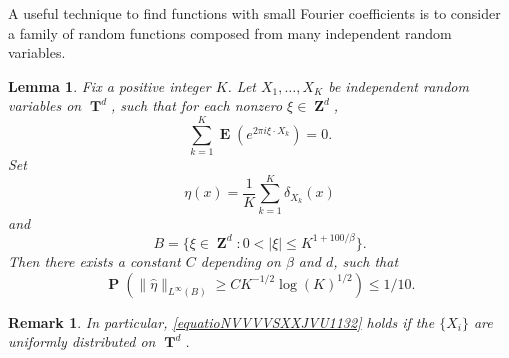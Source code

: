 \documentclass[dvipsnames,letterpaper,12pt]{article}
\numberwithin{equation}{section}
\DeclareMathOperator{\ZZ}{\mathbf{Z}}
\DeclareMathOperator{\TT}{\mathbf{T}}
\newtheorem{lemma}[theorem]{Lemma}
\newtheorem{remark}[theorem]{Remark}
\numberwithin{theorem}{section}
\DeclareMathOperator{\EE}{\mathbf{E}}
\DeclareMathOperator{\PP}{\mathbf{P}}
\begin{document}
A useful technique to find functions with small Fourier coefficients is to consider a family of random functions composed from many independent random variables.

\begin{lemma} \label{LemmaGISCICS1}
    Fix a positive integer $K$. Let $X_1, \dots, X_K$ be independent random variables on $\TT^d$, such that for each nonzero $\xi \in \ZZ^d$,
    \begin{equation} \label{equatioNVVVVSXXJVU1132}
        \sum_{k = 1}^K \EE \left( e^{2 \pi i \xi \cdot X_k} \right) = 0.
    \end{equation}
    Set
    \[ \eta(x) = \frac{1}{K} \sum_{k = 1}^K \delta_{X_k}(x) \]
    and
    \[ B = \{ \xi \in \ZZ^d: 0 < |\xi| \leq K^{1+100/\beta} \}. \]
    Then there exists a constant $C$ depending on $\beta$ and $d$, such that%
    \[ \PP \left( \| \widehat{\eta} \|_{L^\infty(B)} \geq C K^{-1/2} \log(K)^{1/2} \right) \leq 1/10. \]
\end{lemma}

\begin{remark}
    In particular, \eqref{equatioNVVVVSXXJVU1132} holds if the $\{ X_i \}$ are uniformly distributed on $\TT^d$.
\end{remark}
\end{document}

